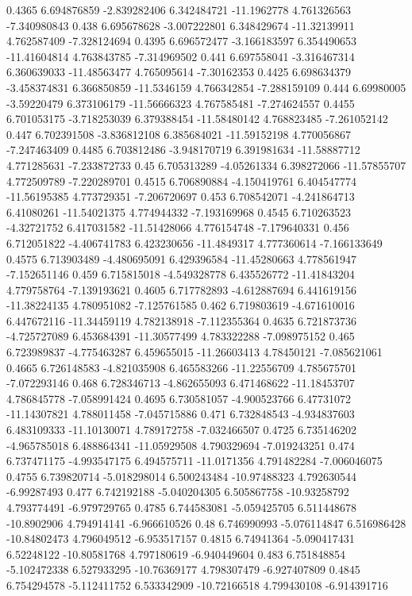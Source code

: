 {0.4365 6.694876859 -2.839282406 6.342484721 -11.1962778 4.761326563 -7.340980843
0.438 6.695678628 -3.007222801 6.348429674 -11.32139911 4.762587409 -7.328124694
0.4395 6.696572477 -3.166183597 6.354490653 -11.41604814 4.763843785 -7.314969502
0.441 6.697558041 -3.316467314 6.360639033 -11.48563477 4.765095614 -7.30162353
0.4425 6.698634379 -3.458374831 6.366850859 -11.5346159 4.766342854 -7.288159109
0.444 6.69980005 -3.59220479 6.373106179 -11.56666323 4.767585481 -7.274624557
0.4455 6.701053175 -3.718253039 6.379388454 -11.58480142 4.768823485 -7.261052142
0.447 6.702391508 -3.836812108 6.385684021 -11.59152198 4.770056867 -7.247463409
0.4485 6.703812486 -3.948170719 6.391981634 -11.58887712 4.771285631 -7.233872733
0.45 6.705313289 -4.05261334 6.398272066 -11.57855707 4.772509789 -7.220289701
0.4515 6.706890884 -4.150419761 6.404547774 -11.56195385 4.773729351 -7.206720697
0.453 6.708542071 -4.241864713 6.41080261 -11.54021375 4.774944332 -7.193169968
0.4545 6.710263523 -4.32721752 6.417031582 -11.51428066 4.776154748 -7.179640331
0.456 6.712051822 -4.406741783 6.423230656 -11.4849317 4.777360614 -7.166133649
0.4575 6.713903489 -4.480695091 6.429396584 -11.45280663 4.778561947 -7.152651146
0.459 6.715815018 -4.549328778 6.435526772 -11.41843204 4.779758764 -7.139193621
0.4605 6.717782893 -4.612887694 6.441619156 -11.38224135 4.780951082 -7.125761585
0.462 6.719803619 -4.671610016 6.447672116 -11.34459119 4.782138918 -7.112355364
0.4635 6.721873736 -4.725727089 6.453684391 -11.30577499 4.783322288 -7.098975152
0.465 6.723989837 -4.775463287 6.459655015 -11.26603413 4.78450121 -7.085621061
0.4665 6.726148583 -4.821035908 6.465583266 -11.22556709 4.785675701 -7.072293146
0.468 6.728346713 -4.862655093 6.471468622 -11.18453707 4.786845778 -7.058991424
0.4695 6.730581057 -4.900523766 6.47731072 -11.14307821 4.788011458 -7.045715886
0.471 6.732848543 -4.934837603 6.483109333 -11.10130071 4.789172758 -7.032466507
0.4725 6.735146202 -4.965785018 6.488864341 -11.05929508 4.790329694 -7.019243251
0.474 6.737471175 -4.993547175 6.494575711 -11.0171356 4.791482284 -7.006046075
0.4755 6.739820714 -5.018298014 6.500243484 -10.97488323 4.792630544 -6.99287493
0.477 6.742192188 -5.040204305 6.505867758 -10.93258792 4.793774491 -6.979729765
0.4785 6.744583081 -5.059425705 6.511448678 -10.8902906 4.794914141 -6.966610526
0.48 6.746990993 -5.076114847 6.516986428 -10.84802473 4.796049512 -6.953517157
0.4815 6.74941364 -5.090417431 6.52248122 -10.80581768 4.797180619 -6.940449604
0.483 6.751848854 -5.102472338 6.527933295 -10.76369177 4.798307479 -6.927407809
0.4845 6.754294578 -5.112411752 6.533342909 -10.72166518 4.799430108 -6.914391716
}
